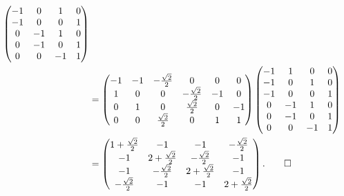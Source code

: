 \begin{loesung}
\begin{teilaufgaben}
\begin{align*}
\begin{pmatrix}
  -1&  0&  1&  0\\
  -1&  0&  0&  1\\
   0& -1&  1&  0\\
   0& -1&  0&  1\\
   0&  0& -1&  1
\end{pmatrix}
\\
&=
\begin{pmatrix}
-1&-1&-\frac{\sqrt{2}}2&                0& 0& 0\\
 1& 0&                0&-\frac{\sqrt{2}}2&-1& 0\\
 0& 1&                0& \frac{\sqrt{2}}2& 0&-1\\
 0& 0& \frac{\sqrt{2}}2&                0& 1& 1
\end{pmatrix}
\begin{pmatrix}
  -1&  1&  0&  0\\
  -1&  0&  1&  0\\
  -1&  0&  0&  1\\
   0& -1&  1&  0\\
   0& -1&  0&  1\\
   0&  0& -1&  1
\end{pmatrix}
\\
&=
\begin{pmatrix}
 1+\frac{\sqrt{2}}2&                -1&                -1& -\frac{\sqrt{2}}2\\
-1                 &2+\frac{\sqrt{2}}2& -\frac{\sqrt{2}}2&                -1\\
-1                 & -\frac{\sqrt{2}}2&2+\frac{\sqrt{2}}2&                -1\\
  -\frac{\sqrt{2}}2&                -1&                -1&2+\frac{\sqrt{2}}2
\end{pmatrix}.
\qedhere
\end{align*}
\end{teilaufgaben}
\end{loesung}
